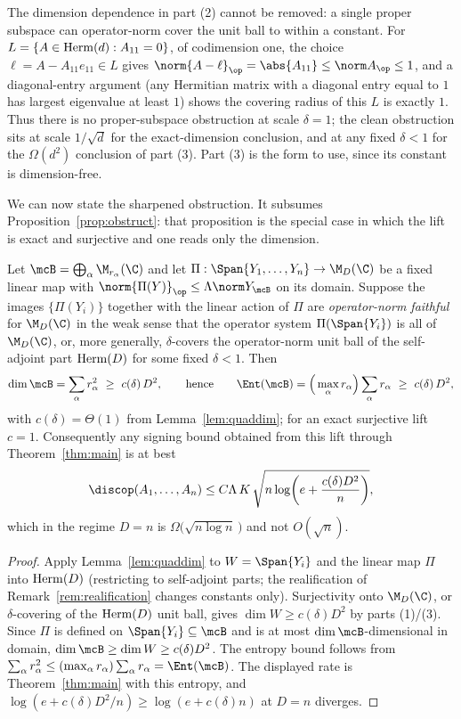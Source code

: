 \begin{remark}\label{rem:threshold}
The dimension dependence in part (2) cannot be removed: a single proper subspace
can operator-norm cover the unit ball to within a constant. For
$L=\{A\in\mathrm{Herm}(d):A_{11}=0\}$, of codimension one, the choice
$\ell=A-A_{11}e_{11}\in L$ gives
$\norm{A-\ell}_{\op}=\abs{A_{11}}\le\norm A_{\op}\le1$, and a diagonal-entry
argument (any Hermitian matrix with a diagonal entry equal to $1$ has largest
eigenvalue at least $1$) shows the covering radius of this $L$ is exactly $1$.
Thus there is no proper-subspace obstruction at scale $\delta=1$; the clean
obstruction sits at scale $1/\sqrt d$ for the exact-dimension conclusion, and at
any fixed $\delta<1$ for the $\Omega(d^2)$ conclusion of part (3). Part (3) is the
form to use, since its constant is dimension-free.
\end{remark}

We can now state the sharpened obstruction. It subsumes
Proposition~\ref{prop:obstruct}: that proposition is the special case in which the
lift is exact and surjective and one reads only the dimension.

\begin{theorem}
\label{thm:sharpobstruct}
Let $\mcB=\bigoplus_\alpha\M_{r_\alpha}(\C)$ and let
$\Pi:\Span\{Y_1,\ldots,Y_n\}\to\M_D(\C)$ be a fixed linear map with
$\norm{\Pi(Y)}_{\op}\le\Lambda\norm Y_{\mcB}$ on its domain. Suppose the images
$\{\Pi(Y_i)\}$ together with the linear action of $\Pi$ are
\emph{operator-norm faithful} for $\M_D(\C)$ in the weak sense that the operator
system $\Pi(\Span\{Y_i\})$ is all of $\M_D(\C)$, or, more generally,
$\delta$-covers the operator-norm unit ball of the self-adjoint part $\mathrm{Herm}(D)$
for some fixed $\delta<1$. Then
\[
\dim\mcB=\sum_\alpha r_\alpha^2\ \ge\ c(\delta)\,D^2,
\qquad\text{hence}\qquad
\Ent(\mcB)=\Big(\max_\alpha r_\alpha\Big)\sum_\alpha r_\alpha\ \ge\ c(\delta)\,D^2,
\]
with $c(\delta)=\Theta(1)$ from Lemma~\ref{lem:quaddim}; for an exact surjective
lift $c=1$. Consequently any signing bound obtained from this lift through
Theorem~\ref{thm:main} is at best
\[
\discop(A_1,\ldots,A_n)\le C\Lambda\, K\,\sqrt{n\log\!\left(e+\frac{c(\delta)D^2}{n}\right)} ,
\]
which in the regime $D=n$ is $\Omega\big(\sqrt{n\log n}\,\big)$ and not $O(\sqrt n)$.
\end{theorem}

\begin{proof}
Apply Lemma~\ref{lem:quaddim} to $W=\Span\{Y_i\}$ and the linear map $\Pi$ into
$\mathrm{Herm}(D)$ (restricting to self-adjoint parts; the realification of
Remark~\ref{rem:realification} changes constants only). Surjectivity onto
$\M_D(\C)$, or $\delta$-covering of the $\mathrm{Herm}(D)$ unit ball, gives
$\dim W\ge c(\delta)D^2$ by parts (1)/(3). Since $\Pi$ is defined on
$\Span\{Y_i\}\subseteq\mcB$ and is at most $\dim\mcB$-dimensional in domain,
$\dim\mcB\ge\dim W\ge c(\delta)D^2$. The entropy bound follows from
$\sum_\alpha r_\alpha^2\le(\max_\alpha r_\alpha)\sum_\alpha r_\alpha=\Ent(\mcB)$.
The displayed rate is Theorem~\ref{thm:main} with this entropy, and
$\log(e+c(\delta)D^2/n)\ge\log(e+c(\delta)n)$ at $D=n$ diverges.
\end{proof}

